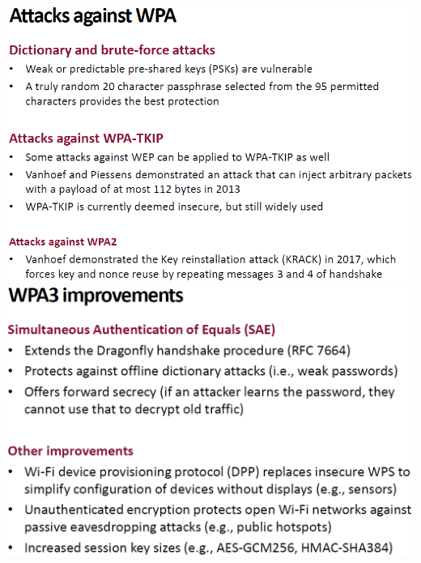 \documentclass[12pt]{article}
\begin{document}
 \includegraphics[width=\linewidth]{./slides/L7P1ATT.PNG}\\
 \includegraphics[width=\linewidth]{./slides/L7P1WPA3.PNG}
 
\end{document}
